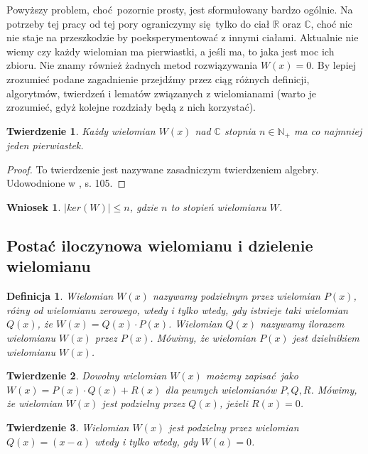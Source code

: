 \documentclass{article}
\newtheorem{thm}{Twierdzenie}
\newtheorem{wniosek}{Wniosek}
\newtheorem{definicja}{Definicja}
\begin{document}
Powyższy problem, choć pozornie prosty, jest sformułowany bardzo ogólnie. Na potrzeby tej pracy od tej pory ograniczymy się tylko do ciał $\mathbb{R}$ oraz $\mathbb{C}$, choć nic nie staje na przeszkodzie by poeksperymentować z innymi ciałami. Aktualnie nie wiemy czy każdy wielomian ma pierwiastki, a jeśli ma, to jaka jest moc ich zbioru. Nie znamy również żadnych metod rozwiązywania $W(x) = 0$. By lepiej zrozumieć podane zagadnienie przejdźmy przez ciąg różnych definicji, algorytmów, twierdzeń i lematów związanych z wielomianami (warto je zrozumieć, gdyż kolejne rozdziały będą z nich korzystać).

\begin{thm}
Każdy wielomian $W(x)$ nad $\mathbb{C}$ stopnia $n \in \mathbb{N}_+$ ma co najmniej jeden pierwiastek.
\end{thm}

\begin{proof}
To twierdzenie jest nazywane zasadniczym twierdzeniem algebry. Udowodnione w \cite{leja}, s. 105.
\end{proof}

\begin{wniosek}
$| ker(W) | \leq n$, gdzie $n$ to stopień wielomianu $W$.	
\end{wniosek}


\subsection{Postać iloczynowa wielomianu i dzielenie wielomianu}


\begin{definicja}
Wielomian $W(x)$ nazywamy podzielnym przez wielomian $P(x)$, różny od wielomianu zerowego, wtedy i tylko wtedy, gdy istnieje taki wielomian $Q(x)$, że $W(x) = Q(x) \cdot P(x)$. Wielomian $Q(x)$ nazywamy ilorazem wielomianu $W(x)$ przez $P(x)$. Mówimy, że wielomian $P(x)$ jest dzielnikiem wielomianu $W(x)$.
\end{definicja}


\begin{thm}
Dowolny wielomian $W(x)$ możemy zapisać jako $W(x) = P(x) \cdot Q(x) + R(x)$ dla pewnych wielomianów $P, Q, R$. Mówimy, że wielomian $W(x)$ jest podzielny przez $Q(x)$, jeżeli $R(x) = 0$. 
\end{thm}

\begin{thm}
Wielomian $W(x)$ jest podzielny przez wielomian $Q(x) = (x-a)$ wtedy i tylko wtedy, gdy $W(a) = 0$.	
\end{thm}
\end{document}
